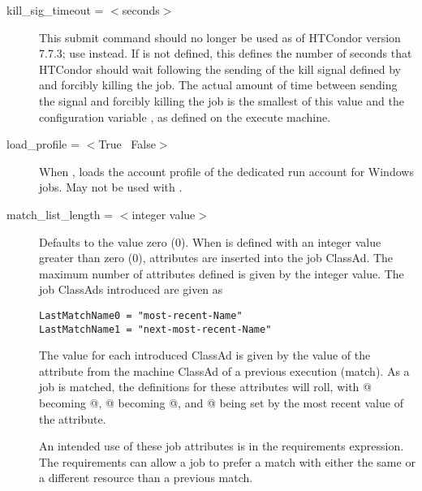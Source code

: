 \begin{description}

\label{condor-submit-kill-sig-timeout}
\item[kill\_sig\_timeout = $<$seconds$>$] This submit command should
no longer be used as of HTCondor version 7.7.3;
use  instead.
If  is not defined,
this defines the number of seconds that HTCondor
should wait following the sending of the kill signal defined by
 and forcibly killing the job.
The actual amount of time between sending the signal and forcibly killing
the job is the smallest of this value and the configuration variable
, as defined on the execute machine.


\label{condor-submit-load-profile}
\item[load\_profile = $<$True \Bar\ False$>$]
When , loads the account profile of the dedicated run account for
Windows jobs.
May not be used with .


\label{condor-submit-match-list-length}
\item[match\_list\_length = $<$integer value$>$]
Defaults to the value zero (0).
When  is defined with an integer value
greater than zero (0),
attributes are inserted into the job ClassAd.
The maximum number of attributes defined is given by the integer
value.
The job ClassAds introduced are given as
\begin{verbatim}
LastMatchName0 = "most-recent-Name"
LastMatchName1 = "next-most-recent-Name"
\end{verbatim}

The value for each introduced ClassAd is given by the
value of the  attribute
from the machine ClassAd of a previous execution (match).
As a job is matched, the definitions for these attributes
will roll,
with @ becoming @,
@ becoming @,
and @ being set by the most recent
value of the  attribute.

An intended use of
these job attributes is in the requirements expression.
The requirements can allow a job to prefer a match with either the same
or a different resource than a previous match.


\end{description}
